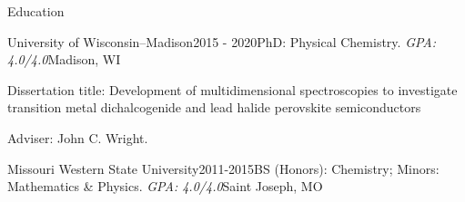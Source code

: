 \documentclass{resume} %
\begin{document}
\begin{rSection}{Education}

\begin{rSubsection}{University of Wisconsin--Madison}{2015 - 2020}{PhD: Physical Chemistry. \emph{GPA: 4.0/4.0}}{Madison, WI}
\item Dissertation title: Development of multidimensional spectroscopies to investigate transition metal dichalcogenide and lead halide perovskite semiconductors
\item Adviser: John C. Wright.
\end{rSubsection}

\begin{rSubsectionlistless}{Missouri Western State University}{2011-2015}{BS (Honors): Chemistry; Minors: Mathematics \& Physics. \emph{GPA: 4.0/4.0}}{Saint Joseph, MO} 
\end{rSubsectionlistless}



\end{rSection}
\end{document}

